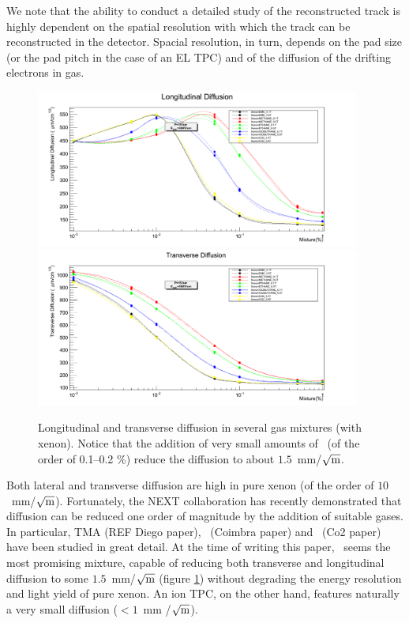 \documentclass{JINST}
\begin{document}
We note that the ability to conduct a detailed study of the reconstructed track is highly dependent on the spatial resolution with which the track can be reconstructed in the detector. Spacial resolution, in turn, depends on the pad size (or the pad pitch in the case of an EL TPC) and of the diffusion of the drifting electrons in gas.

\begin{figure}[!htb]
\centering
\includegraphics[width=0.95\textwidth]{img/DL.png}\\
\includegraphics[width=0.95\textwidth]{img/DT.png}
\caption{Longitudinal and transverse diffusion in several gas mixtures (with xenon). Notice that the addition of very small amounts of \COT\ (of the order of 0.1--0.2 \%) reduce the diffusion to about $1.5$~mm/$\sqrt{\rm{m}}$.} \label{fig.DIF}
\end{figure}

Both lateral and transverse diffusion are high in pure xenon (of the order of $10$~mm/$\sqrt{\rm{m}}$). Fortunately, the NEXT collaboration has recently demonstrated that diffusion can be reduced one order of magnitude by the addition of suitable gases. In particular, TMA (REF Diego paper), \CHF\ (Coimbra paper) and \COT\ (Co2 paper) have been studied in great detail. At the time of writing this paper, \COT\ seems the most promising mixture, capable of reducing both transverse and longitudinal diffusion to some $1.5$~mm/$\sqrt{\rm{m}}$ (figure \ref{fig.DIF}) without degrading the energy resolution and light yield of pure xenon. 
An ion TPC, on the other hand, features naturally a very small diffusion ($<1$~mm /$\sqrt{\rm{m}}$).
\end{document}

